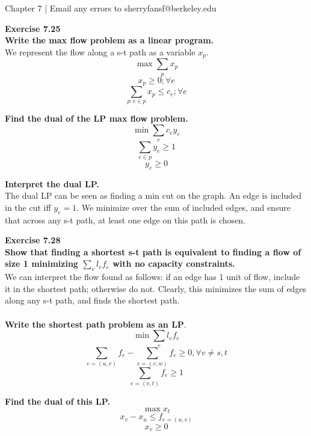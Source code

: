 \documentclass{article}
\newenvironment{problem}[2][Exercise]
    { \begin{mdframed}[backgroundcolor=gray!20] \textbf{#1 #2} \\}
    {  \end{mdframed}}
\begin{document}
\begin{mdframed}[backgroundcolor=blue!20]
Chapter 7 | Email any errors to sherryfansf@berkeley.edu
\end{mdframed}

\begin{problem}{7.25}
    \textbf{Write the max flow problem as a linear program.} \\
    We represent the flow along a s-t path as a variable $x_p$.
    \[
        \max \sum_p x_p
    \]
    \[
        x_p \geq 0; \forall e
    \]
    \[
        \sum_{p: e \in p} x_p \leq c_e; \forall e
    \]
    
    \textbf{Find the dual of the LP max flow problem.}
    \[
        \min \sum_e c_ey_e
    \]
    \[
        \sum_{e \in p} y_e \geq 1
    \]
    \[
        y_e \geq 0
    \]
    
    \textbf{Interpret the dual LP.} \\
    The dual LP can be seen as finding a min cut on the graph. An edge is included in the cut iff $y_e = 1$. We minimize over the sum of included edges, and ensure that across any s-t path, at least one edge on this path is chosen.
\end{problem}

\begin{problem} {7.28}
    \textbf{Show that finding a shortest s-t path is equivalent to finding a flow of size 1 minimizing $\sum_e l_ef_e$ with no capacity constraints.} \\
    We can interpret the flow found as follows: if an edge has 1 unit of flow, include it in the shortest path; otherwise do not. Clearly, this minimizes the sum of edges along any s-t path, and finds the shortest path. \\ \\
    \textbf{Write the shortest path problem as an LP}. \\
    \[
        \min \sum_e l_ef_e
    \]
    \[
        \sum_{e=(u, v)} f_e - \sum_{e=(v, w)} f_e \geq 0, \forall v \neq s, t
    \]
    \[
        \sum_{e = (v, t)} f_e \geq 1
    \]
    
    \textbf{Find the dual of this LP.} \\
    \[
        \max x_t
    \]
    \[
        x_v - x_u \leq f_{e = (u, v)}
    \]
    \[
        x_v \geq 0
    \]
\end{problem}
\end{document}
